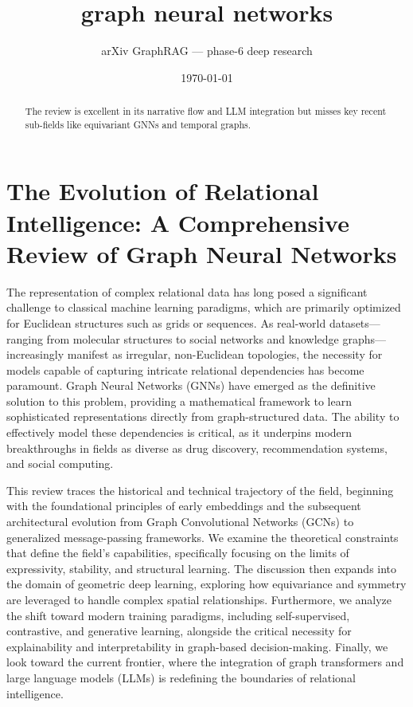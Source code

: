 \documentclass[11pt]{article}
\title{graph neural networks}
\author{arXiv GraphRAG --- phase-6 deep research}
\date{\today}
\begin{document}
\maketitle

\begin{abstract}
The review is excellent in its narrative flow and LLM integration but misses key recent sub-fields like equivariant GNNs and temporal graphs.
\end{abstract}

\section{The Evolution of Relational Intelligence: A Comprehensive Review of Graph Neural Networks}

The representation of complex relational data has long posed a significant challenge to classical machine learning paradigms, which are primarily optimized for Euclidean structures such as grids or sequences. As real-world datasets—ranging from molecular structures to social networks and knowledge graphs—increasingly manifest as irregular, non-Euclidean topologies, the necessity for models capable of capturing intricate relational dependencies has become paramount. Graph Neural Networks (GNNs) have emerged as the definitive solution to this problem, providing a mathematical framework to learn sophisticated representations directly from graph-structured data. The ability to effectively model these dependencies is critical, as it underpins modern breakthroughs in fields as diverse as drug discovery, recommendation systems, and social computing.

This review traces the historical and technical trajectory of the field, beginning with the foundational principles of early embeddings and the subsequent architectural evolution from Graph Convolutional Networks (GCNs) to generalized message-passing frameworks. We examine the theoretical constraints that define the field's capabilities, specifically focusing on the limits of expressivity, stability, and structural learning. The discussion then expands into the domain of geometric deep learning, exploring how equivariance and symmetry are leveraged to handle complex spatial relationships. Furthermore, we analyze the shift toward modern training paradigms, including self-supervised, contrastive, and generative learning, alongside the critical necessity for explainability and interpretability in graph-based decision-making. Finally, we look toward the current frontier, where the integration of graph transformers and large language models (LLMs) is redefining the boundaries of relational intelligence.
\end{document}
